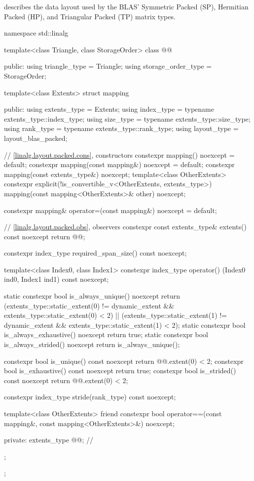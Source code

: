 \pnum
\begin{note}
 describes the data layout used by
the BLAS'
Symmetric Packed (SP), Hermitian Packed (HP), and Triangular Packed (TP)
matrix types.
\end{note}
\begin{codeblock}
namespace std::linalg {
  template<class Triangle, class StorageOrder>
  class @@ {
  public:
    using triangle_type = Triangle;
    using storage_order_type = StorageOrder;

    template<class Extents>
    struct mapping {
    public:
      using extents_type = Extents;
      using index_type = typename extents_type::index_type;
      using size_type = typename extents_type::size_type;
      using rank_type = typename extents_type::rank_type;
      using layout_type = layout_blas_packed;

      // \ref{linalg.layout.packed.cons}, constructors
      constexpr mapping() noexcept = default;
      constexpr mapping(const mapping&) noexcept = default;
      constexpr mapping(const extents_type&) noexcept;
      template<class OtherExtents>
        constexpr explicit(!is_convertible_v<OtherExtents, extents_type>)
          mapping(const mapping<OtherExtents>& other) noexcept;

      constexpr mapping& operator=(const mapping&) noexcept = default;

      // \ref{linalg.layout.packed.obs}, observers
      constexpr const extents_type& extents() const noexcept { return @@; }

      constexpr index_type required_span_size() const noexcept;

      template<class Index0, class Index1>
        constexpr index_type operator() (Index0 ind0, Index1 ind1) const noexcept;

      static constexpr bool is_always_unique() noexcept {
        return (extents_type::static_extent(0) != dynamic_extent &&
                extents_type::static_extent(0) < 2) ||
               (extents_type::static_extent(1) != dynamic_extent &&
                extents_type::static_extent(1) < 2);
      }
      static constexpr bool is_always_exhaustive() noexcept { return true; }
      static constexpr bool is_always_strided() noexcept
        { return is_always_unique(); }

      constexpr bool is_unique() const noexcept {
        return @@.extent(0) < 2;
      }
      constexpr bool is_exhaustive() const noexcept { return true; }
      constexpr bool is_strided() const noexcept {
        return @@.extent(0) < 2;
      }

      constexpr index_type stride(rank_type) const noexcept;

      template<class OtherExtents>
        friend constexpr bool operator==(const mapping&, const mapping<OtherExtents>&) noexcept;

    private:
      extents_type @@{};     // \expos
    };
  };
}
\end{codeblock}

